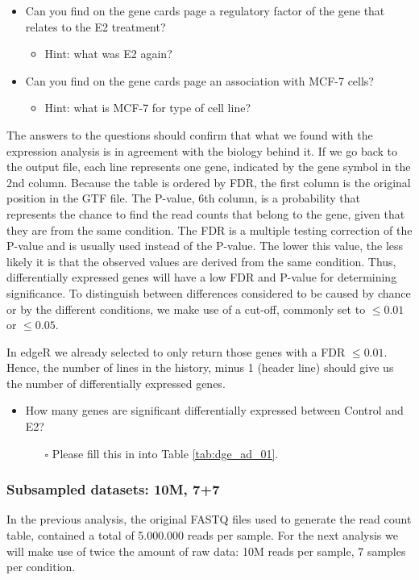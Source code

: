 \begin{itemize}
	\item Can you find on the gene cards page a regulatory factor of the gene that relates
to the E2 treatment?
	\begin{itemize}
		\item Hint: what was E2 again?
	\end{itemize}
	\item Can you find on the gene cards page an association with MCF-7 cells?
	\begin{itemize}
		\item Hint: what is MCF-7 for type of cell line?
	\end{itemize}
\end{itemize}
The answers to the questions should confirm that what we found with the expression analysis is in agreement with the biology behind it.
If we go back to the output file, each line represents one gene, indicated by the gene symbol in the 2nd column.
Because the table is ordered by FDR, the first column is the original position in the GTF file.
The P-value, 6th column, is a probability that represents the chance to find the read counts that belong to the gene, given that they are from the same condition.
The FDR is a multiple testing correction of the P-value and is usually used instead of the P-value. The lower this value, the less likely it is that the observed values are derived from the same condition. Thus, differentially expressed genes will have a low FDR and P-value for determining significance.
To distinguish between differences considered to be caused by chance or by the different conditions, we make use of a cut-off, commonly set to $\leq 0.01$ or $\leq 0.05$.

In edgeR we already selected to only return those genes with a FDR $\leq 0.01$.
Hence, the number of lines in the history, minus 1 (header line) should give us the number of differentially expressed genes.
\begin{itemize}
	\item How many genes are significant differentially expressed between Control and E2? 
	\begin{itemize}
		\item[$\square$] Please fill this in into Table \ref{tab:dge_ad_01}.
	\end{itemize}
\end{itemize}

\subsubsection{Subsampled datasets: 10M, 7+7}
In the previous analysis, the original FASTQ files used to generate the read count table, contained a total of 5.000.000 reads per sample.
For the next analysis we will make use of twice the amount of raw data: 10M reads per sample, 7 samples per condition.


